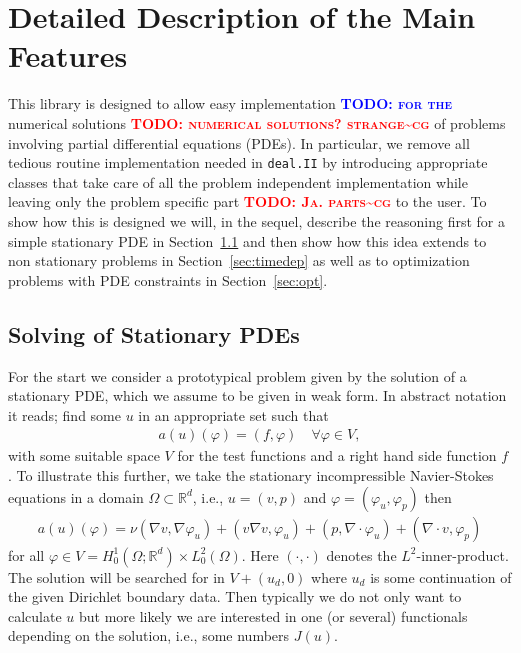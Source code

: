 \documentclass[prodmode,acmtoms]{acmsmall}
\numberwithin{equation}{section}
\newcommand{\R}{\mathbb{R}}
\renewcommand{\phi}{\varphi}
\newcommand{\deal}{\texttt{deal.II}}
\newcommand{\todo}[1]{\textbf{\textsc{\textcolor{blue}{TODO: #1}}}}
\newcommand{\todocg}[1]{\textbf{\textsc{\textcolor{red}{TODO: #1\textasciitilde cg}}}}
\begin{document}
\section{Detailed Description of the Main Features}
\label{detailed_description}
This library is designed to allow easy implementation \todo{for the} numerical solutions \todocg{numerical solutions? strange} 
of problems involving partial differential equations (PDEs). 
In particular, we remove all tedious routine implementation needed in 
\deal{} by introducing appropriate classes that take care of all the 
problem independent implementation while leaving only the problem specific 
part \todocg{Ja. parts} to the user. To show how this is designed we will, in the sequel, 
describe the reasoning first for a simple stationary PDE in 
Section~\ref{subsubsec:stationary problems} and then show
how this idea extends to non stationary problems in 
Section~\ref{sec:timedep} as well as to optimization
problems with PDE constraints in Section~\ref{sec:opt}. 

\subsection{Solving of Stationary PDEs}
\label{subsubsec:stationary problems}
For the start we consider a prototypical problem given by the solution of 
a stationary PDE, which we assume to be given in weak form.
In abstract notation it reads; find some $u$ in an appropriate set
such that
\begin{align}\label{eq:prototype_weak}
a(u)(\phi) = (f,\phi) \quad \forall \phi \in V,
\end{align}
with some suitable space $V$ for the test functions and a 
right hand side function $f$.
To illustrate this further, we take the stationary 
incompressible Navier-Stokes equations in a domain $\Omega \subset \R^d$, 
i.e., $u = (v,p)$ and $\phi = (\phi_u,\phi_p)$ then
\begin{align}\label{eq:ns}
a(u)(\phi) = \nu(\nabla v, \nabla\phi_u) + (v \nabla v,\phi_u) + (p, \nabla \cdot \phi_u) + (\nabla \cdot v ,\phi_p)
\end{align}
for all $\phi \in V = H^1_0(\Omega;\R^d) \times L^2_0(\Omega)$.
Here $(\cdot,\cdot)$ denotes the $L^2$-inner-product.
The solution will be searched for in $V + (u_d,0)$ where $u_d$ is some 
continuation of the given Dirichlet boundary data.
Then typically we do not only want to calculate $u$ but more likely we are 
interested in one (or several) functionals depending on the solution, i.e., some numbers $J(u)$.
\end{document}
